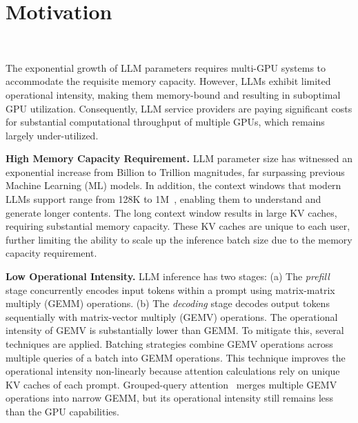 \section{Motivation}~\label{sec:motivation}


The exponential growth of LLM parameters requires multi-GPU systems to accommodate the requisite memory capacity. However, LLMs exhibit limited operational intensity, making them memory-bound and resulting in suboptimal GPU utilization. Consequently, LLM service providers are paying significant costs for substantial computational throughput of multiple GPUs, which remains largely under-utilized.

\textbf{High Memory Capacity Requirement.} LLM parameter size has witnessed an exponential increase from Billion to Trillion magnitudes, far surpassing previous Machine Learning (ML) models.
In addition, the context windows that modern LLMs support range from 128K to 1M~\cite{gpt4-turbo, gemini-pro}, enabling them to understand and generate longer contents.
The long context window results in large KV caches, requiring substantial memory capacity.
These KV caches are unique to each user, further limiting the ability to scale up the inference batch size due to the memory capacity requirement.

\textbf{Low Operational Intensity.} LLM inference has two stages:
(a) The \textit{prefill} stage concurrently encodes input tokens within a prompt using matrix-matrix multiply (GEMM) operations.
(b) The \textit{decoding} stage decodes output tokens sequentially with matrix-vector multiply (GEMV) operations.
The operational intensity of GEMV is substantially lower than GEMM.
To mitigate this, several techniques are applied.
Batching strategies combine GEMV operations across multiple queries of a batch into GEMM operations.
This technique improves the operational intensity non-linearly because attention calculations rely on unique KV caches of each prompt.
Grouped-query attention~\cite{gqa} merges multiple GEMV operations into narrow GEMM, but its operational intensity still remains less than the GPU capabilities.

